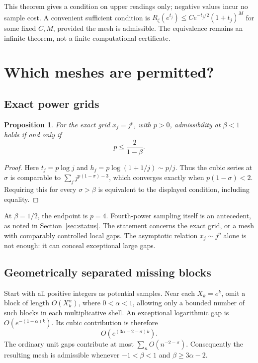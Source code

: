 \documentclass[11pt,a4paper]{article}
\newtheorem{proposition}[theorem]{Proposition}
\theoremstyle{definition}
\theoremstyle{remark}
\numberwithin{equation}{section}
\begin{document}
This theorem gives a condition on upper readings only; negative values
incur no sample cost. A convenient sufficient condition is
\(R_\zeta(e^{t_j})\leq C e^{-t_j/2}(1+t_j)^M\) for some fixed
\(C,M\), provided the mesh is admissible. The equivalence remains an
infinite theorem, not a finite computational certificate.

\section{Which meshes are permitted?}
\label{sec:meshes}

\subsection{Exact power grids}

\begin{proposition}
\label{prop:powergrid}
For the exact grid \(x_j=j^p\), with \(p>0\), admissibility at
\(\beta<1\) holds if and only if
\[
 p\leq\frac2{1-\beta}.
\]
\end{proposition}

\begin{proof}
Here \(t_j=p\log j\) and
\(h_j=p\log(1+1/j)\sim p/j\). Thus the cubic series at \(\sigma\)
is comparable to
\(\sum_j j^{p(1-\sigma)-3}\), which converges exactly when
\(p(1-\sigma)<2\). Requiring this for every \(\sigma>\beta\)
is equivalent to the displayed condition, including equality.
\end{proof}

At \(\beta=1/2\), the endpoint is \(p=4\). Fourth-power sampling
itself is an antecedent, as noted in Section~\ref{sec:status}. The
statement concerns the exact grid, or a mesh with comparably controlled
local gaps. The asymptotic relation \(x_j\sim j^p\) alone is not
enough: it can conceal exceptional large gaps.

\subsection{Geometrically separated missing blocks}

Start with all positive integers as potential samples. Near each
\(X_k=e^k\), omit a block of length \(O(X_k^\alpha)\), where
\(0<\alpha<1\), allowing only a bounded number of such blocks in
each multiplicative shell. An exceptional logarithmic gap is
\(O(e^{-(1-\alpha)k})\). Its cubic contribution is therefore
\[
 O\left(e^{(3\alpha-2-\sigma)k}\right).
\]
The ordinary unit gaps contribute at most
\(\sum_n O(n^{-2-\sigma})\). Consequently the resulting mesh is
admissible whenever \(-1<\beta<1\) and \(\beta\geq3\alpha-2\).
\end{document}
